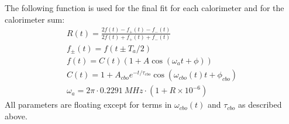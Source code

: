	The following function is used for the final fit for each calorimeter and for the calorimeter sum:
	\begin{gather}
			R(t) = \frac{2f(t) - f_{+}(t) - f_{-}(t)}{2f(t) + f_{+}(t) + f_{-}(t)} \\[10pt]
			f_{\pm}(t) = f(t \pm T_{a}/2) \\[10pt]
			f(t) = C(t) (1 + A \cos(\omega_{a}t + \phi)) \\[10pt]
			C(t) = 1 + A_{cbo} e^{-t/\tau_{cbo}} \cos(\omega_{cbo}(t)t + \phi_{cbo}) \\[10pt]
			\omega_{a} = 2 \pi \cdot \SI{0.2291}{MHz} \cdot (1 + R \times 10^{-6})
	\end{gather}
	All parameters are floating except for terms in $\omega_{cbo}(t)$ and $\tau_{cbo}$ as described above.



